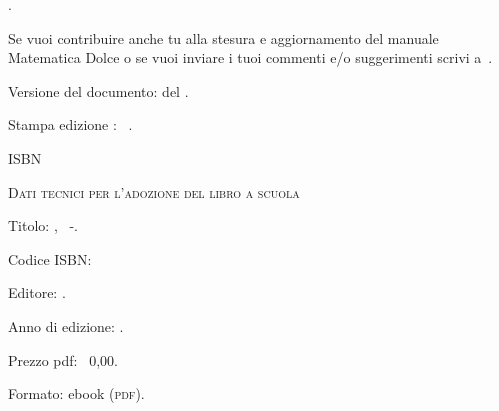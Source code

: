 {{ {\texcol}.

 Se vuoi contribuire anche tu alla stesura e aggiornamento 
del manuale Matematica Dolce o se  vuoi inviare i tuoi commenti e/o 
suggerimenti scrivi 
a~.

\vspace{2ex}
 Versione del documento: {\docvers} del {\oggi}.

 Stampa edizione \edizione : \mese\ \anno.

 ISBN \mcisbn

\vspace{2ex}
 {\scshape{Dati tecnici per l'adozione del libro a scuola}}

 Titolo: \serie, \titolo\ -\edizione.

 Codice ISBN: \mcisbn 

 Editore: \href{http://www.matematicamente.it}{\editore}. 

 Anno di edizione: \anno.

 Prezzo pdf: \officialeuro\ 0,00.

 Formato: ebook (\scshape{pdf}).
}}
